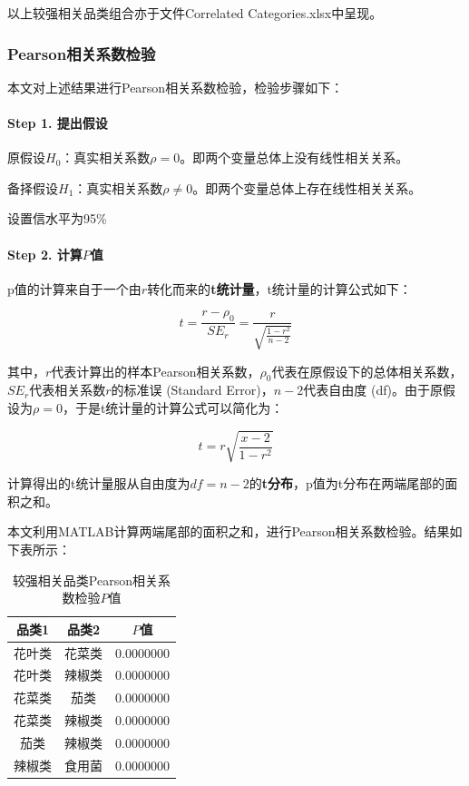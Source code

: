 \documentclass{article}
\begin{document}
	以上较强相关品类组合亦于文件Correlated Categories.xlsx中呈现。
	
	\subsubsection{Pearson相关系数检验}
	
	本文对上述结果进行Pearson相关系数检验，检验步骤如下：
	
	\paragraph{Step 1. 提出假设}
	
	原假设$H_0$：真实相关系数$\rho = 0$。即两个变量总体上没有线性相关关系。
	
	备择假设$H_1$：真实相关系数$\rho \neq 0$。即两个变量总体上存在线性相关关系。
	
	设置信水平为95\%
	
	\paragraph{Step 2. 计算$P$值}
	
	p值的计算来自于一个由$r$转化而来的\textbf{t统计量}，t统计量的计算公式如下：
	
	\begin{equation}
		t = \frac{r - \rho_0}{SE_r} = \frac{r}{\sqrt{\frac{1-r^2}{n-2}}}
		\label{eq:t_test_correlation}
	\end{equation}
	
	其中，$r$代表计算出的样本Pearson相关系数，$\rho_0$代表在原假设下的总体相关系数，$SE_r$代表相关系数$r$的标准误 (Standard Error)，$n-2$代表自由度 (df)。由于原假设为$\rho = 0$，于是t统计量的计算公式可以简化为：
	
	\begin{equation}
		t = r \sqrt{\frac{x-2}{1-r^2}}
		\label{eq:t_test_simplified}
	\end{equation}
	
	计算得出的t统计量服从自由度为$\textit{df} = n - 2$的\textbf{t分布}，p值为t分布在两端尾部的面积之和。
	
	本文利用MATLAB计算两端尾部的面积之和，进行Pearson相关系数检验。结果如下表所示：
	
	\begin{table}[h!]
		\centering
		\caption{较强相关品类Pearson相关系数检验$P$值}
		\label{tab:p_value_strong}
		\renewcommand{\arraystretch}{1.5} 
		\renewcommand{\heavyrulewidth}{1.2pt}
		\begin{tabular}{ccc}
			\toprule
			品类1 & 品类2 & $P$值 \\
			\midrule
			花叶类 & 花菜类 & 0.0000000 \\
			花叶类 & 辣椒类 & 0.0000000 \\
			花菜类 & 茄类 & 0.0000000 \\
			花菜类 & 辣椒类 & 0.0000000 \\
			茄类 & 辣椒类 & 0.0000000 \\
			辣椒类 & 食用菌 & 0.0000000 \\
			\bottomrule
		\end{tabular}
		\renewcommand{\heavyrulewidth}{0.8pt}
	\end{table}
	
\end{document}
